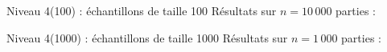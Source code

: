 \begin{frame}{Niveau 4(100) : échantillons de taille 100}
Résultats sur $n=10\,000$ parties :
\begin{center}
\end{center}
\end{frame}

\begin{frame}{Niveau 4(1000) : échantillons de taille 1000}
Résultats sur $n=1\,000$ parties :
\begin{center}
\end{center}
\end{frame}

